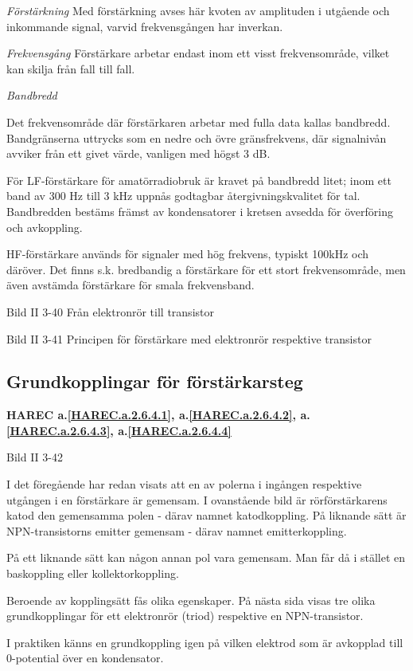 \emph{Förstärkning}
Med förstärkning avses här kvoten av amplituden i utgående och
inkommande signal, varvid frekvensgången har inverkan.

\emph{Frekvensgång}
Förstärkare arbetar endast inom ett visst frekvensområde, vilket kan
skilja från fall till fall.

\emph{Bandbredd}

Det frekvensområde där förstärkaren arbetar med fulla data kallas
bandbredd. Bandgränserna uttrycks som en nedre och övre gränsfrekvens,
där signalnivån avviker från ett givet värde, vanligen med högst 3 dB.

För LF-förstärkare för amatörradiobruk är kravet på bandbredd litet;
inom ett band av 300 Hz till 3 kHz uppnås godtagbar
återgivningskvalitet för tal. Bandbredden bestäms främst av
kondensatorer i kretsen avsedda för överföring och avkoppling.

HF-förstärkare används för signaler med hög frekvens, typiskt 100kHz
och däröver.  Det finns s.k. bredbandig a förstärkare för ett stort
frekvensområde, men även avstämda förstärkare för smala frekvensband.

Bild II 3-40 Från elektronrör till transistor

Bild II 3-41 Principen för förstärkare med elektronrör respektive transistor

\subsection{Grundkopplingar för förstärkarsteg}
\textbf{HAREC a.\ref{HAREC.a.2.6.4.1}, a.\ref{HAREC.a.2.6.4.2}, a.\ref{HAREC.a.2.6.4.3}, a.\ref{HAREC.a.2.6.4.4}\label{myHAREC.a.2.6.4.1}\label{myHAREC.a.2.6.4.2}\label{myHAREC.a.2.6.4.3}\label{myHAREC.a.2.6.4.4}}

Bild II 3-42

I det föregående har redan visats att en av polerna i ingången
respektive utgången i en förstärkare är gemensam. I ovanstående bild
är rörförstärkarens katod den gemensamma polen - därav namnet
katodkoppling.  På liknande sätt är NPN-transistorns emitter gemensam
- därav namnet emitterkoppling.

På ett liknande sätt kan någon annan pol vara gemensam. Man får då i
stället en baskoppling eller kollektorkoppling.

Beroende av kopplingsätt fås olika egenskaper. På nästa sida visas tre
olika grundkopplingar för ett elektronrör (triod) respektive en
NPN-transistor.

I praktiken känns en grundkoppling igen på vilken elektrod som är
avkopplad till 0-potential över en kondensator.

